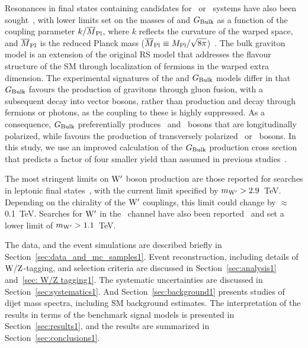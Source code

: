 Resonances in final states containing candidates for \PW\PW\ or
\cPZ\cPZ\ systems have also been
sought~\cite{CMSZZPAS2,ATLASWWPAPER,ATLASZZPAPER,CDFZZPAPER}, with
lower limits set on the masses of \GRS and $G_\mathrm{Bulk}$ as a function of
the coupling parameter $k/\overline{M}_\text{Pl}$, where $k$ reflects the curvature of
the warped space, and $\overline{M}_\text{Pl}$ is the reduced Planck mass ($\overline{M}_\text{Pl} \equiv
M_\text{Pl}/\sqrt{8\pi}$)~\cite{rs1,Randall:1999vf}. The bulk graviton
model is an extension of the original RS model that addresses the
flavour structure of the SM through localization of fermions in the
warped extra dimension. The experimental signatures of the \GRS and
$G_\mathrm{Bulk}$ models differ in that $G_\mathrm{Bulk}$ favours the production of
gravitons through gluon fusion, with a subsequent decay into vector bosons,
rather than production and decay through fermions or photons, as the
coupling to these is highly suppressed. As a consequence, $G_\mathrm{Bulk}$
preferentially produces \PW\ and \cPZ\ bosons that are longitudinally polarized,
while \GRS favours the production of transversely polarized
\PW\ or \cPZ\ bosons. In this study, we use an improved calculation of
the $G_\mathrm{Bulk}$ production cross section~\cite{GravitonWWZZ1} that predicts a factor of four smaller yield than
assumed in previous studies~\cite{CMSZZPAS2,ATLASWWPAPER}.

The most stringent limits on $\mathrm{W}^{\prime}$ boson production  are those reported
for searches in leptonic final
states~\cite{CMSwprimePAPER2013,ATLASwprimePAPER}, with the current
limit specified by $m_{\mathrm{W}^{\prime}}>2.9$~TeV. Depending on the chirality
of the $\mathrm{W}^{\prime}$ couplings, this limit could change by $\approx$0.1~TeV. Searches for $\mathrm{W}^{\prime}$ in the \PW\cPZ\ channel have also been
reported~\cite{CMSwprimeWZPAS,ATLASWWPAPER,ATLASwprimeWZPAS} and set
a lower limit of $m_{\mathrm{W}^{\prime}}>1.1$~TeV.

The data, and the event simulations are described briefly
in Section~\ref{sec:data_and_mc_samples1}. Event reconstruction, including
details of ${\rm W}/{\rm Z}$-tagging, and selection criteria are discussed in
Section~\ref{sec:analysis1} and~\ref{sec: W/Z tagging1}. 
The systematic uncertainties are discussed in Section~\ref{sec:systematics1}. 
And Section~\ref{sec:background1} presents
studies of dijet mass spectra, including SM background estimates.
The interpretation of the results in terms of the benchmark signal models
is presented in Section~\ref{sec:results1}, and the results are summarized in Section~\ref{sec:conclusions1}.





